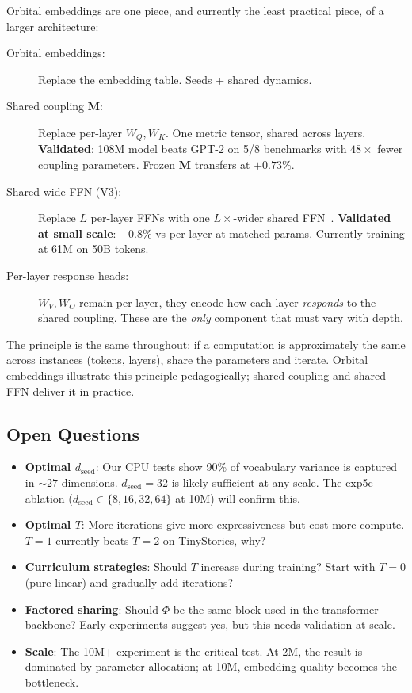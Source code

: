 \documentclass[11pt, a4paper]{article}
\newcommand{\M}{\mathbf{M}}
\theoremstyle{remark}
\begin{document}
Orbital embeddings are one piece, and currently the least practical piece, of a larger architecture:
\begin{description}
    \item[Orbital embeddings:] Replace the embedding table. Seeds + shared dynamics.
    \item[Shared coupling $\M$:] Replace per-layer $W_Q, W_K$. One metric tensor, shared across layers. \textbf{Validated}: 108M model beats GPT-2 on 5/8 benchmarks with $48\times$ fewer coupling parameters. Frozen $\M$ transfers at $+0.73\%$.
    \item[Shared wide FFN (V3):] Replace $L$ per-layer FFNs with one $L\times$-wider shared FFN~\cite{onewideffn2023, geva2021ffn}. \textbf{Validated at small scale}: $-0.8\%$ vs per-layer at matched params. Currently training at 61M on 50B tokens.
    \item[Per-layer response heads:] $W_V, W_O$ remain per-layer, they encode how each layer \emph{responds} to the shared coupling. These are the \emph{only} component that must vary with depth.
\end{description}
The principle is the same throughout: if a computation is approximately the same across instances (tokens, layers), share the parameters and iterate.
Orbital embeddings illustrate this principle pedagogically; shared coupling and shared FFN deliver it in practice.

\subsection{Open Questions}

\begin{itemize}[nosep]
    \item \textbf{Optimal $d_{\text{seed}}$}: Our CPU tests show 90\% of vocabulary variance is captured in ${\sim}27$ dimensions. $d_{\text{seed}}{=}32$ is likely sufficient at any scale. The exp5c ablation ($d_{\text{seed}} \in \{8, 16, 32, 64\}$ at 10M) will confirm this.
    \item \textbf{Optimal $T$}: More iterations give more expressiveness but cost more compute. $T = 1$ currently beats $T = 2$ on TinyStories, why?
    \item \textbf{Curriculum strategies}: Should $T$ increase during training? Start with $T = 0$ (pure linear) and gradually add iterations?
    \item \textbf{Factored sharing}: Should $\Phi$ be the same block used in the transformer backbone? Early experiments suggest yes, but this needs validation at scale.
    \item \textbf{Scale}: The 10M+ experiment is the critical test. At 2M, the result is dominated by parameter allocation; at 10M, embedding quality becomes the bottleneck.
\end{itemize}
\end{document}
